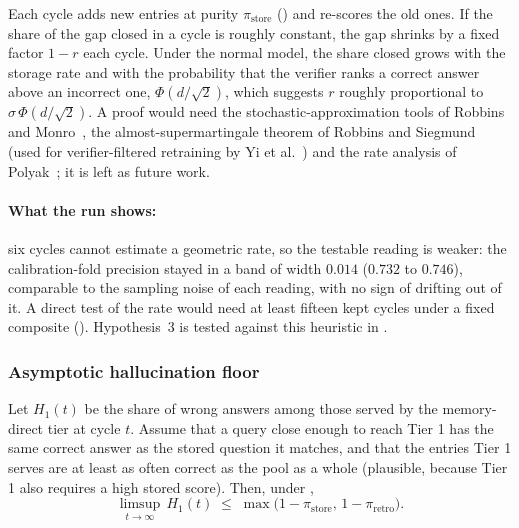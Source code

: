 \begin{sketch}
Each cycle adds new entries at purity $\pi_{\text{store}}$ () and re-scores the old ones. If the share of the gap closed in a cycle is roughly constant, the gap shrinks by a fixed factor $1-r$ each cycle. Under the normal model, the share closed grows with the storage rate and with the probability that the verifier ranks a correct answer above an incorrect one, $\Phi(d/\sqrt{2})$, which suggests $r$ roughly proportional to $\sigma\,\Phi(d/\sqrt{2})$. A proof would need the stochastic-approximation tools of Robbins and Monro~\cite{robbins1951stochastic}, the almost-supermartingale theorem of Robbins and Siegmund~\cite{robbins1971convergence} (used for verifier-filtered retraining by Yi et al.~\cite{fu2025collapse}) and the rate analysis of Polyak~\cite{polyak1990new}; it is left as future work.
\end{sketch}

\paragraph{What the run shows:} six cycles cannot estimate a geometric rate, so the testable reading is weaker: the calibration-fold precision stayed in a band of width $0.014$ ($0.732$ to $0.746$), comparable to the sampling noise of each reading, with no sign of drifting out of it. A direct test of the rate would need at least fifteen kept cycles under a fixed composite (). Hypothesis~3 is tested against this heuristic in .

\subsubsection{Asymptotic hallucination floor}
\label{sec:theorem-asymptotic}

\begin{heuristic}
\label{cor:tier1-floor}
Let $H_{1}(t)$ be the share of wrong answers among those served by the memory-direct tier at cycle $t$. Assume that a query close enough to reach Tier 1 has the same correct answer as the stored question it matches, and that the entries Tier 1 serves are at least as often correct as the pool as a whole (plausible, because Tier 1 also requires a high stored score). Then, under ,
\begin{equation}
\limsup_{t\to\infty}\, H_{1}(t) \;\le\; \max\!\big(1-\pi_{\text{store}},\,1-\pi_{\text{retro}}\big).
\label{eq:thm-asymptotic}
\end{equation}
\end{heuristic}

